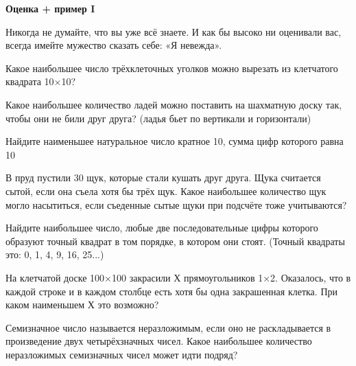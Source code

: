 \centerline{\bf \Huge Оценка + пример I}

\begin{flushright}
        \scriptsize{Никогда не думайте, что вы уже всё знаете. И как бы высоко ни оценивали вас, всегда имейте мужество сказать себе: «Я невежда».}
\end{flushright}

 Какое наибольшее число трёхклеточных уголков можно вырезать из клетчатого квадрата 10$\times$10?

 Какое наибольшее количество ладей можно поставить на шахматную доску так, чтобы они не били друг друга? (ладья бьет по вертикали и горизонтали)

 Найдите наименьшее натуральное число кратное 10, сумма цифр которого равна 10

 В пруд пустили 30 щук, которые стали кушать друг друга. Щука считается сытой, если она съела хотя бы трёх щук. Какое наибольшее количество щук могло насытиться, если съеденные сытые щуки при подсчёте тоже учитываются?

 Найдите наибольшее число, любые две последовательные цифры которого образуют точный квадрат в том порядке, в котором они стоят. (Точный квадраты это: 0, 1, 4, 9, 16, 25...)

 На клетчатой доске 100×100 закрасили Х прямоугольников 1×2.
Оказалось, что в каждой строке и в каждом столбце есть хотя
бы одна закрашенная клетка. При каком наименьшем Х это
возможно?

 Семизначное число называется неразложимым, если оно не
раскладывается в произведение двух четырёхзначных чисел. Какое
наибольшее количество неразложимых семизначных чисел может идти
подряд?


